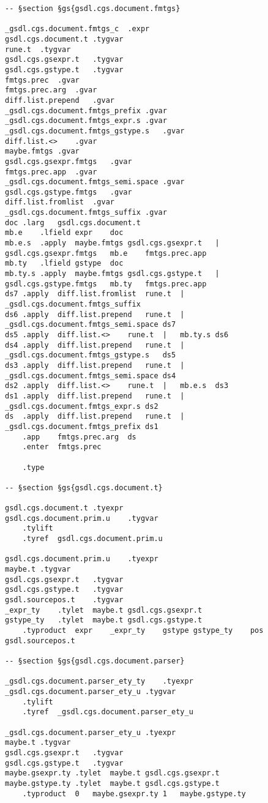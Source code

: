 \documentclass{report}
\begin{document}
\begin{verbatim}
-- §section §gs{gsdl.cgs.document.fmtgs}

_gsdl.cgs.document.fmtgs_c	.expr
gsdl.cgs.document.t	.tygvar
rune.t	.tygvar
gsdl.cgs.gsexpr.t	.tygvar
gsdl.cgs.gstype.t	.tygvar
fmtgs.prec	.gvar
fmtgs.prec.arg	.gvar
diff.list.prepend	.gvar
_gsdl.cgs.document.fmtgs_prefix	.gvar
_gsdl.cgs.document.fmtgs_expr.s	.gvar
_gsdl.cgs.document.fmtgs_gstype.s	.gvar
diff.list.<>	.gvar
maybe.fmtgs	.gvar
gsdl.cgs.gsexpr.fmtgs	.gvar
fmtgs.prec.app	.gvar
_gsdl.cgs.document.fmtgs_semi.space	.gvar
gsdl.cgs.gstype.fmtgs	.gvar
diff.list.fromlist	.gvar
_gsdl.cgs.document.fmtgs_suffix	.gvar
doc	.larg	gsdl.cgs.document.t
mb.e	.lfield	expr	doc
mb.e.s	.apply	maybe.fmtgs	gsdl.cgs.gsexpr.t	|	gsdl.cgs.gsexpr.fmtgs	mb.e	fmtgs.prec.app
mb.ty	.lfield	gstype	doc
mb.ty.s	.apply	maybe.fmtgs	gsdl.cgs.gstype.t	|	gsdl.cgs.gstype.fmtgs	mb.ty	fmtgs.prec.app
ds7	.apply	diff.list.fromlist	rune.t	|	_gsdl.cgs.document.fmtgs_suffix
ds6	.apply	diff.list.prepend	rune.t	|	_gsdl.cgs.document.fmtgs_semi.space	ds7
ds5	.apply	diff.list.<>	rune.t	|	mb.ty.s	ds6
ds4	.apply	diff.list.prepend	rune.t	|	_gsdl.cgs.document.fmtgs_gstype.s	ds5
ds3	.apply	diff.list.prepend	rune.t	|	_gsdl.cgs.document.fmtgs_semi.space	ds4
ds2	.apply	diff.list.<>	rune.t	|	mb.e.s	ds3
ds1	.apply	diff.list.prepend	rune.t	|	_gsdl.cgs.document.fmtgs_expr.s	ds2
ds	.apply	diff.list.prepend	rune.t	|	_gsdl.cgs.document.fmtgs_prefix	ds1
	.app	fmtgs.prec.arg	ds
	.enter	fmtgs.prec

	.type

-- §section §gs{gsdl.cgs.document.t}

gsdl.cgs.document.t	.tyexpr
gsdl.cgs.document.prim.u	.tygvar
	.tylift
	.tyref	gsdl.cgs.document.prim.u

gsdl.cgs.document.prim.u	.tyexpr
maybe.t	.tygvar
gsdl.cgs.gsexpr.t	.tygvar
gsdl.cgs.gstype.t	.tygvar
gsdl.sourcepos.t	.tygvar
_expr_ty	.tylet	maybe.t	gsdl.cgs.gsexpr.t
gstype_ty	.tylet	maybe.t	gsdl.cgs.gstype.t
	.typroduct	expr	_expr_ty	gstype gstype_ty	pos	gsdl.sourcepos.t

-- §section §gs{gsdl.cgs.document.parser}

_gsdl.cgs.document.parser_ety_ty	.tyexpr
_gsdl.cgs.document.parser_ety_u	.tygvar
	.tylift
	.tyref	_gsdl.cgs.document.parser_ety_u

_gsdl.cgs.document.parser_ety_u	.tyexpr
maybe.t	.tygvar
gsdl.cgs.gsexpr.t	.tygvar
gsdl.cgs.gstype.t	.tygvar
maybe.gsexpr.ty	.tylet	maybe.t	gsdl.cgs.gsexpr.t
maybe.gstype.ty	.tylet	maybe.t	gsdl.cgs.gstype.t
	.typroduct	0	maybe.gsexpr.ty	1	maybe.gstype.ty
\end{verbatim}
\end{document}
